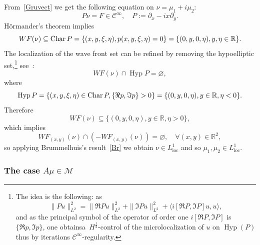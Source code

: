 \documentclass[10pt]{amsart}
\theoremstyle{definition}\newtheorem{defi}[theo]{Definition}\newtheorem{rema}[theo]{Remark}\newtheorem{exam}[theo]{Example}\newtheorem{exem}[theo]{Example}\newtheorem{nota}[theo]{Notation}
\DeclareMathOperator{\Hyp}{Hyp}
\DeclareMathOperator{\Char}{Char}
\DeclareMathOperator{\locc}{loc}
\newcommand{\bbR}{\mathbb{R}}
\newcommand{\clC}{\mathcal{C}}
\newcommand{\clM}{\mathcal{M}}
\let\originalleft\left
\let\originalright\right
\renewcommand{\left}{\mathopen{}\mathclose\bgroup\originalleft}
\renewcommand{\right}{\aftergroup\egroup\originalright}
\let\oldforall\forall
\renewcommand*{\forall}{\mathrel{\oldforall}}
\begin{document}
From~\eqref{Gruvect} we get the following equation on $\nu=\mu_1+i\mu_2$:
\[
P\nu=F\in \clC^\infty,  \quad P:=\partial_x-ix\partial_y.
\]
H\"ormander's theorem implies
\[
WF(\nu)\subseteq \Char P=\left\{(x,y,\xi,\eta),p(x,y,\xi,\eta)=0\right\}=\left\{(0,y,0,\eta),y,\eta\in\bbR\right\}.
\]
The localization of the wave front set can be refined by removing the hypoelliptic set,\footnote{The idea is the following: as
\[
\|P u\|_{L^2}^2=\|\Re P u\|_{L^2}^2+\|\Im P u\|_{L^2}^2+\langle i[\Re P,\Im P] u, u\rangle,
\]
and as the principal symbol of the operator of order one $i[\Re P,\Im P]$ is $\{\Re p,\Im p\}$, one obtains\linebreak a~$H^\frac 12$-control of the microlocalization of $u$ on $\Hyp(P)$ thus by iterations $\clC^\infty$-regularity.} see~\cite[Theorem~26.3.5]{Ho4}:
\[
WF(\nu)\cap \Hyp P=\varnothing,
\]
where
\[
\Hyp P=\left\{(x,y,\xi,\eta)\in \Char P,\{\Re p,\Im p\}>0\right\}=\left\{(0,y,0,\eta), y\in\bbR,\eta <0\right\}.
\]
Therefore
\[
WF(\nu)\subseteq\{(0,y,0,\eta), y\in\bbR, \eta >0\},
\]
which implies
\[
WF_{(x,y)}(\nu)\cap (-WF_{(x,y)}(\nu))=\varnothing,\quad\forall (x,y)\in\bbR^2,
\]
so applying Brummelhuis's result~\eqref{Br} we obtain $\nu\in L^1_{\locc}$ and so $\mu_1,\mu_2\in L^1_{\locc}$.


\subsubsection{The case \texorpdfstring{$A\mu\in \clM$}{A mu in M}}
\end{document}
